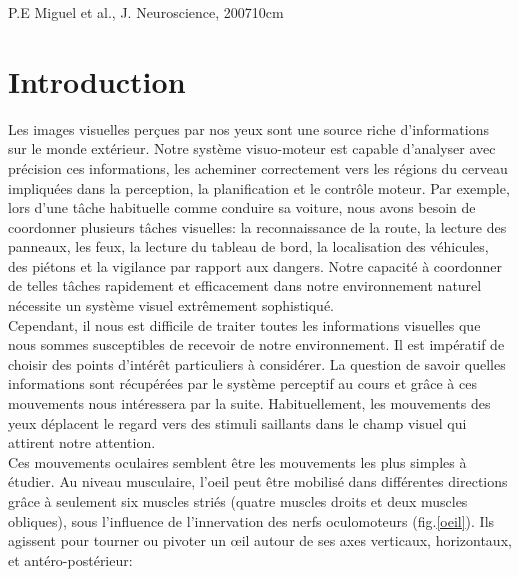 \DontNumberThisInToc
\DontFrameThisInToc
\glsresetall
{}
{P.E Miguel et al., J. Neuroscience, 2007}{10cm}
\section{Introduction}

Les images visuelles perçues par nos yeux sont une source riche d'informations sur le monde extérieur. Notre système visuo-moteur est capable d'analyser avec précision ces informations, les acheminer correctement vers les régions du cerveau impliquées dans la perception, la planification et le contrôle moteur. Par exemple, lors d'une tâche habituelle comme conduire sa voiture, nous avons besoin de coordonner plusieurs tâches visuelles: la reconnaissance de la route, la lecture des panneaux, les feux, la lecture du tableau de bord, la localisation des véhicules, des piétons et la vigilance par rapport aux dangers. Notre capacité à coordonner de telles tâches rapidement et efficacement dans notre environnement naturel nécessite un système visuel extrêmement sophistiqué.\\

Cependant, il nous est difficile de traiter toutes les informations visuelles que nous sommes susceptibles de recevoir de notre environnement. Il est impératif de choisir des points d'intérêt particuliers à considérer. La question de savoir quelles informations sont récupérées par le système perceptif au cours et grâce à ces mouvements nous intéressera par la suite. Habituellement, les mouvements des yeux déplacent le regard vers des stimuli saillants dans le champ visuel qui attirent notre attention. \\

Ces mouvements oculaires semblent être les mouvements les plus simples à étudier. Au niveau musculaire, l'oeil peut être mobilisé dans différentes directions grâce à seulement six muscles striés (quatre muscles droits et deux muscles obliques), sous l'influence de l'innervation des nerfs oculomoteurs (fig.\ref{oeil}). Ils agissent pour tourner ou pivoter un œil autour de ses axes verticaux, horizontaux, et antéro-postérieur:\\


